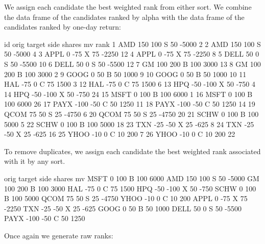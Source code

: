 \documentclass{article}
\begin{document}
We assign each candidate the best weighted rank from either sort.  We
combine the data frame of the candidates ranked by alpha with the data
frame of the candidates ranked by one-day return:


\begin{Schunk}
\begin{Soutput}
     id orig target side shares    mv rank
1   AMD  150    100    S     50 -5000    2
2   AMD  150    100    S     50 -5000    4
3  APPL    0    -75    X     75 -2250   12
4  APPL    0    -75    X     75 -2250    8
5  DELL   50      0    S     50 -5500   10
6  DELL   50      0    S     50 -5500   12
7    GM  100    200    B    100  3000   13
8    GM  100    200    B    100  3000    2
9  GOOG    0     50    B     50  1000    9
10 GOOG    0     50    B     50  1000   10
11  HAL  -75      0    C     75  1500    3
12  HAL  -75      0    C     75  1500    6
13  HPQ  -50   -100    X     50  -750    4
14  HPQ  -50   -100    X     50  -750   24
15 MSFT    0    100    B    100  6000    1
16 MSFT    0    100    B    100  6000   26
17 PAYX -100    -50    C     50  1250   11
18 PAYX -100    -50    C     50  1250   14
19 QCOM   75     50    S     25 -4750    6
20 QCOM   75     50    S     25 -4750   20
21 SCHW    0    100    B    100  5000    5
22 SCHW    0    100    B    100  5000   18
23  TXN  -25    -50    X     25  -625    8
24  TXN  -25    -50    X     25  -625   16
25 YHOO  -10      0    C     10   200    7
26 YHOO  -10      0    C     10   200   22
\end{Soutput}
\end{Schunk}

To remove duplicates, we assign each candidate the best weighted rank
associated with it by any sort.  


\begin{Schunk}
\begin{Soutput}
     orig target side shares    mv
MSFT    0    100    B    100  6000
AMD   150    100    S     50 -5000
GM    100    200    B    100  3000
HAL   -75      0    C     75  1500
HPQ   -50   -100    X     50  -750
SCHW    0    100    B    100  5000
QCOM   75     50    S     25 -4750
YHOO  -10      0    C     10   200
APPL    0    -75    X     75 -2250
TXN   -25    -50    X     25  -625
GOOG    0     50    B     50  1000
DELL   50      0    S     50 -5500
PAYX -100    -50    C     50  1250
\end{Soutput}
\end{Schunk}

Once again we generate raw ranks:
\end{document}
